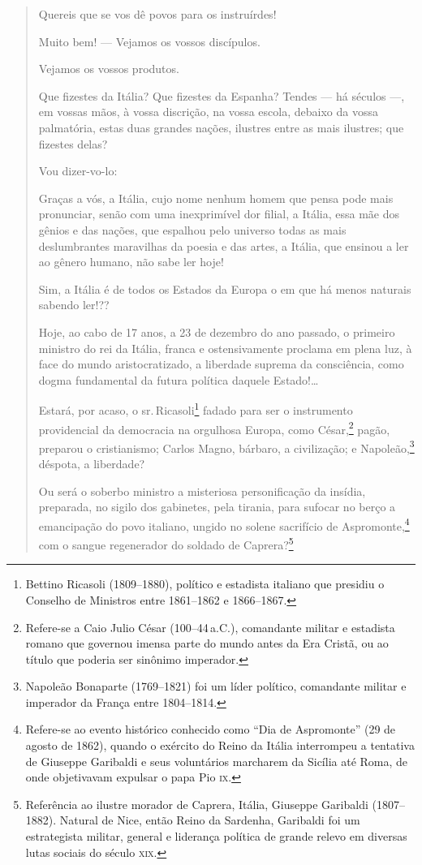 \begin{quote}
Quereis que se vos dê povos para os instruírdes!

Muito bem! --- Vejamos os vossos discípulos.

Vejamos os vossos produtos.

Que fizestes da Itália? Que fizestes da Espanha? Tendes --- há séculos ---,
em vossas mãos, à vossa discrição, na vossa escola, debaixo da vossa
palmatória, estas duas grandes nações, ilustres entre as mais ilustres;
que fizestes delas?

Vou dizer-vo-lo:

Graças a vós, a Itália, cujo nome nenhum homem que pensa pode mais
pronunciar, senão com uma inexprimível dor filial, a Itália, essa mãe
dos gênios e das nações, que espalhou pelo universo todas as mais
deslumbrantes maravilhas da poesia e das artes, a Itália, que ensinou a
ler ao gênero humano, não sabe ler hoje!

Sim, a Itália é de todos os Estados da Europa o em que há menos naturais
sabendo ler!??

Hoje, ao cabo de 17 anos, a 23 de dezembro do ano passado, o primeiro
ministro do rei da Itália, franca e ostensivamente proclama em plena
luz, à face do mundo aristocratizado, a liberdade suprema da
consciência, como dogma fundamental da futura política daquele
Estado!\ldots{}

Estará, por acaso, o sr.\,Ricasoli\footnote{Bettino Ricasoli
  (1809--1880), político e estadista italiano que presidiu o Conselho de
  Ministros entre 1861--1862 e 1866--1867.} fadado para ser o instrumento
providencial da democracia na orgulhosa Europa, como César,\footnote{\label{cesar}
  Refere-se a Caio Julio César (100--44\,a.C.), comandante militar e
  estadista romano que governou imensa parte do mundo antes da Era
  Cristã, ou ao título que poderia ser sinônimo imperador.} pagão,
preparou o cristianismo; Carlos Magno, bárbaro, a civilização; e
Napoleão,\footnote{Napoleão Bonaparte (1769--1821) foi um líder
  político, comandante militar e imperador da França entre 1804--1814.\label{napoleao}}
déspota, a liberdade?

Ou será o soberbo ministro a misteriosa personificação da insídia,
preparada, no sigilo dos gabinetes, pela tirania, para sufocar no berço
a emancipação do povo italiano, ungido no solene sacrifício de
Aspromonte,\footnote{Refere-se ao evento histórico conhecido como ``Dia
  de Aspromonte'' (29 de agosto de 1862), quando o exército do Reino da Itália
  interrompeu a tentativa de Giuseppe Garibaldi e seus voluntários
  marcharem da Sicília até Roma, de onde objetivavam expulsar o papa Pio
  \textsc{ix}.} com o sangue regenerador do soldado de Caprera?\footnote{
  Referência ao ilustre morador de Caprera, Itália, Giuseppe Garibaldi
  (1807--1882). Natural de Nice, então Reino da Sardenha, Garibaldi foi
  um estrategista militar, general e liderança política de grande relevo
  em diversas lutas sociais do século \textsc{xix}.}


\end{quote}
